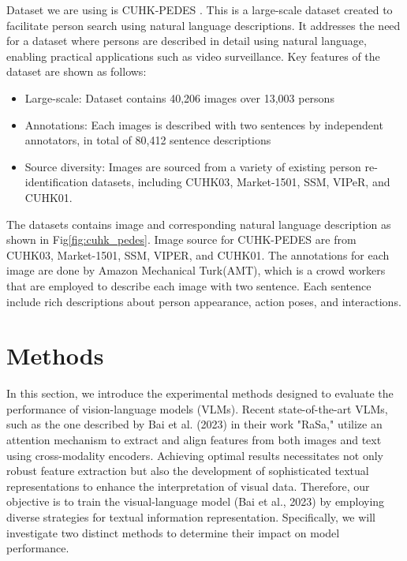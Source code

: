 Dataset we are using is CUHK-PEDES \cite{li2017personsearchnaturallanguage}. This is a large-scale dataset created to facilitate person search using natural language descriptions. It addresses the need for a dataset where persons are described in detail using natural language, enabling practical applications such as video surveillance. Key features of the dataset are shown as follows:
\begin{itemize}
  \item Large-scale: Dataset contains 40,206 images over 13,003 persons 
  \item Annotations: Each images is described with two sentences by independent annotators, in total of 80,412 sentence descriptions
  \item Source diversity: Images are sourced from a variety of existing person re-identification datasets, including CUHK03\cite{li2014deepreid}, Market-1501\cite{7410490}, SSM\cite{ssm}, VIPeR\cite{viper}, and CUHK01\cite{li2012human}.
\end{itemize}

The datasets contains image and corresponding natural language description as shown in Fig\ref{fig:cuhk_pedes}. Image source for CUHK-PEDES are from CUHK03, Market-1501, SSM, VIPER, and CUHK01. The annotations for each image are done by Amazon Mechanical Turk(AMT), which is a crowd workers that are employed to describe each image with two sentence. Each sentence include rich descriptions about person appearance, action poses, and interactions.

\section{Methods}
In this section, we introduce the experimental methods designed to evaluate the performance of vision-language models (VLMs). Recent state-of-the-art VLMs, such as the one described by Bai et al. (2023) in their work "RaSa," utilize an attention mechanism to extract and align features from both images and text using cross-modality encoders. Achieving optimal results necessitates not only robust feature extraction but also the development of sophisticated textual representations to enhance the interpretation of visual data. Therefore, our objective is to train the visual-language model (Bai et al., 2023) by employing diverse strategies for textual information representation. Specifically, we will investigate two distinct methods to determine their impact on model performance.



